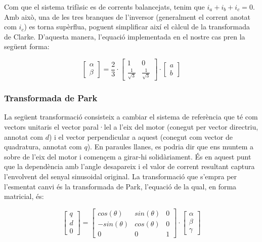 {{        Com que el sistema trifàsic es de corrents balancejats, tenim que $i_a
        + i_b + i_c = 0$. Amb això, una de les tres branques de l'inversor
        (generalment el corrent anotat com $i_c$) es torna supèrflua, poguent
        simplificar així el càlcul de la transformada de Clarke. D'aquesta
        manera, l'equació implementada en el nostre cas pren la següent forma:

        \begin{equation}
            \begin{bmatrix} \alpha \\[5pt] \beta \end{bmatrix}
            = \frac{2}{3} \cdot
            \begin{bmatrix}
                1 & 0 \\[5pt]
                \frac{1}{\sqrt{3}} & \frac{1}{\sqrt{3}}
            \end{bmatrix}
            \cdot \begin{bmatrix} a \\[5pt] b \end{bmatrix}
        \end{equation}
    }

    \subsubsection{ Transformada de Park }
    {
        La següent transformació consisteix a cambiar el sistema de referència
        que té com vectors unitaris el vector paral·lel a l'eix del motor
        (conegut per vector directriu, annotat com $d$) i el vector perpendicular a
        aquest (conegut com vector de quadratura, annotat com $q$). En paraules
        llanes, es podria dir que ens muntem a sobre de l'eix del motor i
        començem a girar-hi solidàriament. És en aquest punt que la dependència
        amb l'angle desapareix i el valor de corrent resultant captura
        l'envolvent del senyal sinusoidal original. La transformació que
        s'empra per l'esmentat canvi és la transformada de Park, l'equació de
        la qual, en forma matricial, és:

        \begin{equation}
            \begin{bmatrix} q \\[5pt] d\\[5pt] 0 \end{bmatrix} = 
            \begin{bmatrix}
                cos(\theta) & sin(\theta) & 0 \\[5pt]
                -sin(\theta) & cos(\theta) & 0 \\[5pt]
                0 & 0 & 1
            \end{bmatrix}
            \cdot \begin{bmatrix} \alpha \\[5pt] \beta \\[5pt] \gamma \end{bmatrix}
        \end{equation}

}}
